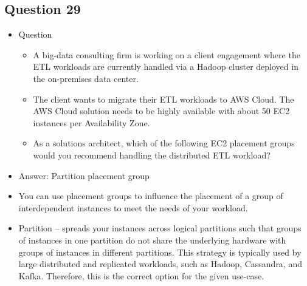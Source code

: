 \documentclass[]{scrartcl}
\begin{document}
\subsection{Question 29}
\begin{itemize}
	\item Question
	\begin{itemize}
		\item A big-data consulting firm is working on a client engagement where the ETL workloads are currently handled via a Hadoop cluster deployed in the on-premises data center. 
		\item The client wants to migrate their ETL workloads to AWS Cloud. The AWS Cloud solution needs to be highly available with about 50 EC2 instances per Availability Zone.
		\item As a solutions architect, which of the following EC2 placement groups would you recommend handling the distributed ETL workload?
	\end{itemize}
	\item Answer: Partition placement group
	\item You can use placement groups to influence the placement of a group of interdependent instances to meet the needs of your workload. 
	\item Partition – spreads your instances across logical partitions such that groups of instances in one partition do not share the underlying hardware with groups of instances in different partitions. This strategy is typically used by large distributed and replicated workloads, such as Hadoop, Cassandra, and Kafka. Therefore, this is the correct option for the given use-case.
\end{itemize}
\end{document}
